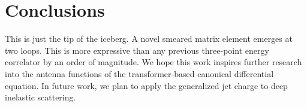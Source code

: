 \section{Conclusions}\label{sec:conclusions}

This is just the tip of the iceberg. A novel smeared matrix element
emerges at two loops. This is more expressive than any previous
three-point energy correlator by an order of magnitude. We hope this
work inspires further research into the antenna functions of the
transformer-based canonical differential equation. In future work, we
plan to apply the generalized jet charge to deep inelastic scattering.

